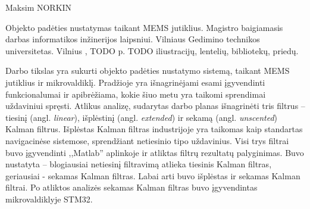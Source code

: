 Maksim NORKIN

Objekto padėties nustatymas taikant MEMS jutiklius. 
Magistro baigiamasis darbas informatikos inžinerijos laipsniui. 
Vilniaus Gedimino technikos universitetas.
Vilnius \the\year, TODO p. TODO iliustracijų, lentelių, bibliotekų, priedų.

Darbo tikslas yra sukurti objekto padėties nustatymo sistemą, taikant MEMS jutiklius ir mikrovaldiklį.
Pradžioje yra išnagrinėjami esami įgyvendinti funkcionalumai ir apibrėžiama, kokie šiuo metu yra taikomi sprendimai uždaviniui spręsti.
Atlikus analizę, sudarytas darbo planas išnagrinėti tris filtrus -- tiesinį (angl. \textit{linear}), išplėstinį (angl. \textit{extended}) ir sekamą (angl. \textit{unscented}) Kalman filtrus.
Išplėstas Kalman filtras industrijoje yra taikomas kaip standartas navigacinėse sistemose, sprendžiant netiesinio tipo uždavinius.
Visi trys filtrai buvo įgyvendinti ,,Matlab'' aplinkoje ir atliktas filtrų rezultatų palyginimas.
Buvo nustatyta -- blogiausiai netiesinį filtravimą atlieka tiesinis Kalman filtras, geriausiai - sekamas Kalman filtras.
Labai arti buvo išplėstas ir sekamas Kalman filtrai.
Po atliktos analizės sekamas Kalman filtras buvo įgyvendintas mikrovaldiklyje STM32.
